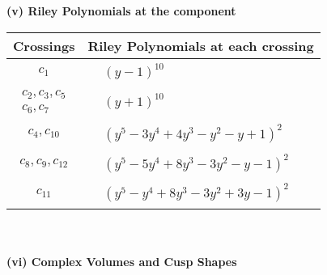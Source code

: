 \documentclass[1p]{elsarticle_modified}
\theoremstyle{definition}
\begin{document}
\newpage\renewcommand{\arraystretch}{1}
\flushleft \textbf{(v) Riley Polynomials at the component}\newline \\
\begin{tabular}{m{50pt}|m{274pt}}
Crossings & \hspace{64pt}Riley Polynomials at each crossing \\
\hline $$\begin{aligned}c_{1}\end{aligned}$$&$\begin{aligned}
&(y-1)^{10}
\end{aligned}$\\
\hline $$\begin{aligned}c_{2},c_{3},c_{5}\\c_{6},c_{7}\end{aligned}$$&$\begin{aligned}
&(y+1)^{10}
\end{aligned}$\\
\hline $$\begin{aligned}c_{4},c_{10}\end{aligned}$$&$\begin{aligned}
&(y^5-3 y^4+4 y^3- y^2- y+1)^2
\end{aligned}$\\
\hline $$\begin{aligned}c_{8},c_{9},c_{12}\end{aligned}$$&$\begin{aligned}
&(y^5-5 y^4+8 y^3-3 y^2- y-1)^2
\end{aligned}$\\
\hline $$\begin{aligned}c_{11}\end{aligned}$$&$\begin{aligned}
&(y^5- y^4+8 y^3-3 y^2+3 y-1)^2
\end{aligned}$\\
\hline
\end{tabular}\\~\\
\newpage\flushleft \textbf{(vi) Complex Volumes and Cusp Shapes}
\end{document}
